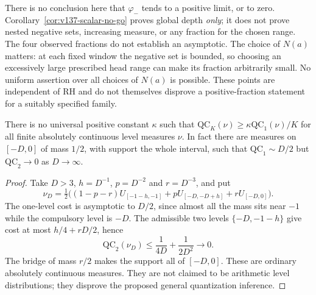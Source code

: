 There is no conclusion here that $\varphi_-$ tends to a positive limit,
or to zero. Corollary~\ref{cor:v137-scalar-no-go} proves global depth
\emph{only}; it does not prove nested negative sets, increasing measure,
or any fraction for the chosen range. The four observed fractions do
not establish an asymptotic. The choice of $N(a)$ matters: at each fixed
window the negative set is bounded, so choosing an excessively large
prescribed head range can make its fraction arbitrarily small. No
uniform assertion over all choices of $N(a)$ is possible. These points
are independent of RH and do not themselves disprove a positive-fraction
statement for a suitably specified family.

\begin{proposition}
\label{prop:v149-qc1-insufficient}
There is no universal positive constant $\kappa$ such that
$\mathrm{QC}_K(\nu)\ge\kappa\mathrm{QC}_1(\nu)/K$ for all finite
absolutely continuous level measures $\nu$. In fact there are measures
on $[-D,0]$ of mass $1/2$, with support the whole interval, such that
$\mathrm{QC}_1\sim D/2$ but $\mathrm{QC}_2\to0$ as $D\to\infty$.
\end{proposition}
\begin{proof}
Take $D>3$, $h=D^{-1}$, $p=D^{-2}$ and $r=D^{-3}$, and put
\[
 \nu_D=\tfrac12\bigl((1-p-r)U_{[-1-h,-1]}
             +pU_{[-D,-D+h]}+rU_{[-D,0]}\bigr).
\]
The one-level cost is asymptotic to $D/2$, since almost all the mass
sits near $-1$ while the compulsory level is $-D$. The admissible two
levels $\{-D,-1-h\}$ give cost at most $h/4+rD/2$, hence
\[
 \mathrm{QC}_2(\nu_D)\le\frac1{4D}+\frac1{2D^2}\longrightarrow0.
\]
The bridge of mass $r/2$ makes the support all of $[-D,0]$. These are
ordinary absolutely continuous measures. They are not claimed to be
arithmetic level distributions; they disprove the proposed general
quantization inference.
\end{proof}


